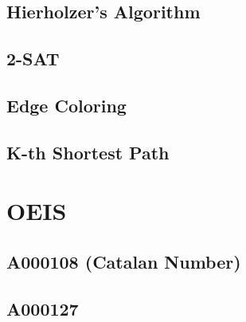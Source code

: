 \subsection{Hierholzer's Algorithm}

\subsection{2-SAT}

\subsection{Edge Coloring}

\subsection{K-th Shortest Path}

\section{OEIS}
\subsection{A000108 (Catalan Number)}

\subsection{A000127}

